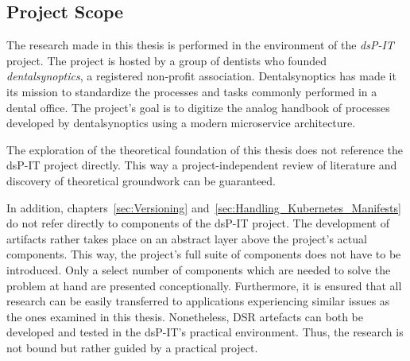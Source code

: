 
\subsection{Project Scope}%
\label{sub:Project_Scope}

The research made in this thesis is performed in the environment of the
\textit{dsP-IT} project. The project is hosted by a group of dentists who
founded \textit{dentalsynoptics}, a registered non-profit association.
Dentalsynoptics has made it its mission to standardize the processes and tasks
commonly performed in a dental office. The project's goal is to digitize the
analog handbook of processes developed by dentalsynoptics using a modern
microservice \autocite{HomepageDentalSynoptics2018} architecture.

The exploration of the theoretical foundation of this thesis does not reference
the dsP-IT project directly. This way a project-independent review of literature
and discovery of theoretical groundwork can be guaranteed.

In addition, chapters~\ref{sec:Versioning}
and~\ref{sec:Handling_Kubernetes_Manifests} do not refer directly to components
of the dsP-IT project. The development of artifacts rather takes place on an
abstract layer above the project's actual components. This way, the project's
full suite of components does not have to be introduced. Only a select number
of components which are needed to solve the problem at hand are presented
conceptionally. Furthermore, it is ensured that all research can be easily
transferred to applications experiencing similar issues as the ones examined in
this thesis. Nonetheless, \ac{DSR} artefacts can both be developed and tested in
the dsP-IT's practical environment. Thus, the research is not bound but rather
guided by a practical project.
